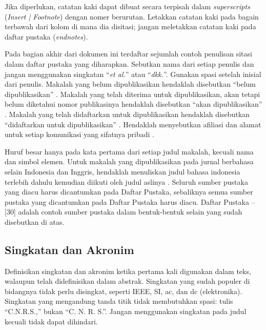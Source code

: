 \documentclass{its-jurnal}
\begin{document}
Jika diperlukan, catatan kaki dapat dibuat secara terpisah dalam \textit{superscripts} (\textit{Insert | Footnote}) dengan nomer berurutan. Letakkan catatan kaki pada bagain terbawah dari kolom di mana dia disitasi; jangan meletakkan catatan kaki pada daftar pustaka (\textit{endnotes}).

Pada bagian akhir dari dokumen ini terdaftar sejumlah contoh penulisan sitasi dalam daftar pustaka yang diharapkan. Sebutkan nama dari setiap penulis dan jangan menggunakan singkatan ``\textit{et al.}'' atau ``\textit{dkk.}''. Gunakan spasi setelah inisial dari penulis. Makalah yang belum dipublikasikan hendaklah disebutkan ``belum dipublikasikan'' \cite{smith}. Makalah yang telah diterima untuk dipublikasikan, akan tetapi belum diketahui nomor publikasinya hendaklah disebutkan ``akan dipublikasikan'' \cite{miller}. Makalah yang telah didaftarkan untuk dipublikasikan hendaklah disebutkan ``didaftarkan untuk dipublikasikan'' \cite{wang}. Hendaklah menyebutkan afiliasi dan alamat untuk setiap komunikasi yang sifatnya pribadi \cite{kaufman}.

Huruf besar hanya pada kata pertama dari setiap judul makalah, kecuali nama dan simbol elemen. Untuk makalah yang dipublikasikan pada jurnal berbahasa selain Indonesia dan Inggris, hendaklah menuliskan judul bahasa indonesia terlebih dahulu kemudian diikuti oleh judul aslinya \cite{yorozu}. Seluruh sumber pustaka yang diacu harus dicantumkan pada Daftar Pustaka, sebaliknya semua sumber pustaka yang dicantumkan pada Daftar Pustaka harus diacu. Daftar Pustaka \cite{young1989}--[30] adalah contoh sumber pustaka dalam bentuk-bentuk selain yang sudah disebutkan di atas.

\subsection{Singkatan dan Akronim}
Definisikan singkatan dan akronim ketika pertama kali digunakan dalam teks, walaupun telah didefinisikan dalam abstrak. Singkatan yang sudah populer di bidangnya tidak perlu disingkat, seperti IEEE, SI, ac, dan dc (elektronika). Singkatan yang mengandung tanda titik tidak membutuhkan spasi: tulis ``C.N.R.S.,'' bukan ``C. N. R. S.''. Jangan menggunakan singkatan pada judul kecuali tidak dapat dihindari.
\end{document}
